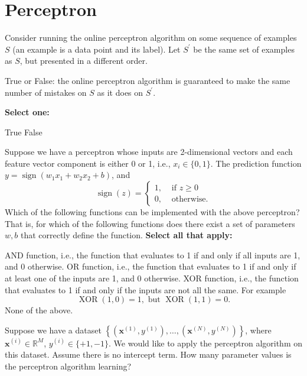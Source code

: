 \documentclass[11pt,addpoints,answers]{exam}
\numberwithin{equation}{section} %
\numberwithin{figure}{section} %
\numberwithin{table}{section} %
\newcommand{\xv}{\mathbf{x}}
\begin{document}
\section{Perceptron}
\begin{questions}
    \question[1] Consider running the online perceptron algorithm on some sequence of examples $S$ (an example is a data point and its label). Let $S^\prime$ be the same set of examples as $S$, but presented in a different order.
    
    True or False: the online perceptron algorithm is guaranteed to make the same number of mistakes on $S$ as it does on $S^\prime$.

    \textbf{Select one:}
    \begin{checkboxes}
        \choice True
        \choice False
    \end{checkboxes}


    
    \question[3] Suppose we have a perceptron whose inputs are 2-dimensional vectors and each feature vector component is either 0 or 1, i.e., $x_i \in \{0,1\}$. The prediction function $y = \operatorname{sign}(w_1x_1 + w_2x_2 + b)$, and
    $$
    \operatorname{sign}(z) = 
    \begin{cases}
    1, & \textrm{ if } z \geq 0\\
    0, & \textrm{ otherwise}.
    \end{cases}
    $$
    Which of the following functions can be implemented with the above perceptron? That is, for which of the following functions does there exist a set of parameters $w,b$ that correctly define the function. 
    \textbf{Select all that apply:}
    {
    \checkboxchar{$\Box$} \checkedchar{$\blacksquare$}
    \begin{checkboxes}
        \choice AND function, i.e., the function that evaluates to 1 if and only if all inputs are 1, and 0 otherwise.
        \choice OR function, i.e., the function that evaluates to 1 if and only if at least one of the inputs are 1, and 0 otherwise.
        \choice XOR function, i.e., the function that evaluates to 1 if and only if the inputs are not all the same. For example
        $$
        \operatorname{XOR}(1,0) = 1, \textrm{ but } \operatorname{XOR}(1,1) = 0.
        $$
        \choice None of the above.
    \end{checkboxes}
    }

    
    
    \clearpage
    
    \question[2] Suppose we have a dataset $\left\{ \left(\xv^{(1)},y^{(1)}\right),\ldots, \left(\xv^{(N)},y^{(N)}\right) \right\}$, where $\xv^{(i)} \in \mathbb{R}^M$, $y^{(i)}\in\{+1,-1\}$. We would like to apply the perceptron algorithm on this dataset. Assume there is no intercept term. How many parameter values is the perceptron algorithm learning?


\end{questions}
\end{document}

